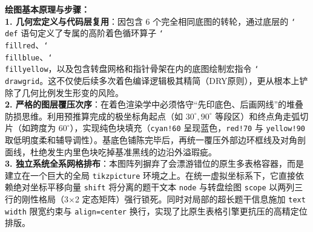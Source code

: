 \vspace{0.6cm}

{\small\color{blue!70!black}
\textbf{绘图基本原理与步骤：}\\
\textbf{1. 几何宏定义与代码层复用}：因包含 $6$ 个完全相同底图的转轮，通过底层的 \texttt{\char`\\def} 语句定义了专属的高阶着色循环算子 \texttt{\char`\\fillred}、\texttt{\char`\\fillblue}、\texttt{\char`\\fillyellow}，以及包含转盘网格和指针骨架在内的底图绘制宏指令 \texttt{\char`\\drawgrid}。这不仅使后续多次着色编译逻辑极其精简（DRY原则），更从根本上铲除了几何比例发生形变的风险。\\
\textbf{2. 严格的图层覆压次序}：在着色渲染学中必须恪守“先印底色、后画网线”的堆叠防损思维。利用预推算完成的极坐标角起点（如 $30^\circ, 90^\circ$ 等段区）和终点角走弧切片（如跨度为 $60^\circ$），实现纯色块填充（\texttt{cyan!60} 呈现蓝色，\texttt{red!70} 与 \texttt{yellow!90} 取低明度柔和辅导调性）。基底色铺陈完毕后，再统一覆压外部边环框线及对角剖面线，杜绝发生内里色块吃掉基准黑线的边沿外溢瑕疵。\\
\textbf{3. 独立系统全系网格排布}：本图阵列摒弃了会漂游错位的原生多表格容器，而是建立在一个巨大的全局 \texttt{tikzpicture} 环境之上。在统一虚拟坐标系下，它直接依赖绝对坐标平移向量 \texttt{shift} 将分离的题干文本 \texttt{node} 与转盘绘图 \texttt{scope} 以两列三行的刚性格局（3$\times$2 定态矩阵）强行锁死。同时对局部的超长题干信息施加 \texttt{text width} 限宽约束与 \texttt{align=center} 换行，实现了比原生表格引擎更抗压的高精定位排版。
}


\newpage


